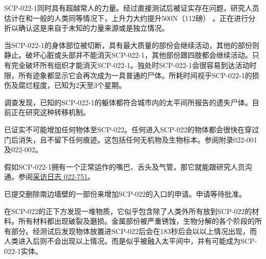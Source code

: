 SCP-022-1同时具有超越常人的力量。经过直接测试后被证实存在问题，研究人员估计在和一般的人类同等情况下，上升力大约提升500N（112磅） 。正在进行分折以确认这是来自于未知的力量来源或是独立情况。

当SCP-022-1的身体部位被切断，具有最大质量的部份会继续活动，其他的部份则静止。破坏心脏或头部并不能消灭SCP-022-1，其他部份跟四肢都会继续活动。只有完全破坏所有组织才能消灭SCP-022-1。独处时SCP-022-1会很容易到达活动时限，所有迹象都显示它会再次成为一具普通的尸体。所耗时间视乎SCP-022-1的损伤及腐烂程度，已知为2天至3个星期。

调查发现，已知的SCP-022-1的躯体都符合城市内的太平间所报告的遗失尸体。目前正在研究这种转移机制。

已证实不可能增加任何物体至SCP-022。任何进入SCP-022的物体都会很快在穿过门后消失，且不留下任何痕迹。这包括任何无机物及生物标本。参阅附录022-001及022-002。

假如SCP-022-1拥有一个正常运作的嘴巴、舌头及气管，那它就能跟研究人员沟通。参阅\hyperref[chap:doc.interview-log-022-751]{采访日志 022-751}。

 已提交删除南边墙壁的一部份来增加SCP-022的入口的申请。申请等待批准。

 在SCP-022的正下方发现一堆物质，它似乎包含除了人类外所有放到SCP-022的材料。所有材料都出现破裂及磨损。金属部份被严重锈蚀，生物分解的各个阶段的所有部分。经测试后发现物体放置进SCP-022后会在183秒后会以以上情况出现，而人类进入后则不会出现以上情况。而是似乎被融入太平间中，并有可能成为SCP-022-1实体。
